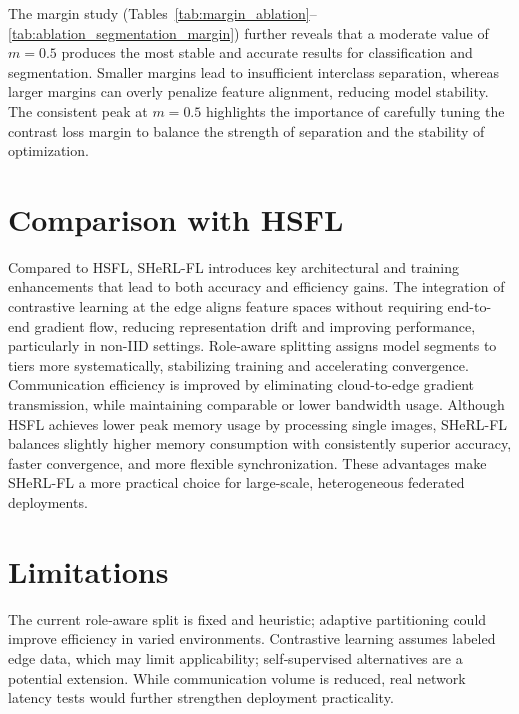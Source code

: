 \documentclass[letterpaper]{article} %
\begin{document}
     The margin study (Tables~\ref{tab:margin_ablation}--\ref{tab:ablation_segmentation_margin}) further reveals that a moderate value of $m=0.5$ produces the most stable and accurate results for classification and segmentation. Smaller margins lead to insufficient interclass separation, whereas larger margins can overly penalize feature alignment, reducing model stability. The consistent peak at $m=0.5$ highlights the importance of carefully tuning the contrast loss margin to balance the strength of separation and the stability of optimization.

\section{Comparison with HSFL}
    Compared to HSFL, SHeRL-FL introduces key architectural and training enhancements that lead to both accuracy and efficiency gains. The integration of contrastive learning at the edge aligns feature spaces without requiring end-to-end gradient flow, reducing representation drift and improving performance, particularly in non-IID settings. Role-aware splitting assigns model segments to tiers more systematically, stabilizing training and accelerating convergence. Communication efficiency is improved by eliminating cloud-to-edge gradient transmission, while maintaining comparable or lower bandwidth usage. Although HSFL achieves lower peak memory usage by processing single images, SHeRL-FL balances slightly higher memory consumption with consistently superior accuracy, faster convergence, and more flexible synchronization. These advantages make SHeRL-FL a more practical choice for large-scale, heterogeneous federated deployments.

\section{Limitations}
    The current role‑aware split is fixed and heuristic; adaptive partitioning could improve efficiency in varied environments. Contrastive learning assumes labeled edge data, which may limit applicability; self‑supervised alternatives are a potential extension. While communication volume is reduced, real network latency tests would further strengthen deployment practicality.
\end{document}
